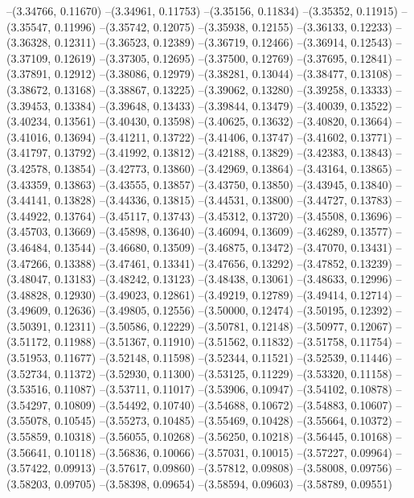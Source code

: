 --(3.34766, 0.11670)
--(3.34961, 0.11753)
--(3.35156, 0.11834)
--(3.35352, 0.11915)
--(3.35547, 0.11996)
--(3.35742, 0.12075)
--(3.35938, 0.12155)
--(3.36133, 0.12233)
--(3.36328, 0.12311)
--(3.36523, 0.12389)
--(3.36719, 0.12466)
--(3.36914, 0.12543)
--(3.37109, 0.12619)
--(3.37305, 0.12695)
--(3.37500, 0.12769)
--(3.37695, 0.12841)
--(3.37891, 0.12912)
--(3.38086, 0.12979)
--(3.38281, 0.13044)
--(3.38477, 0.13108)
--(3.38672, 0.13168)
--(3.38867, 0.13225)
--(3.39062, 0.13280)
--(3.39258, 0.13333)
--(3.39453, 0.13384)
--(3.39648, 0.13433)
--(3.39844, 0.13479)
--(3.40039, 0.13522)
--(3.40234, 0.13561)
--(3.40430, 0.13598)
--(3.40625, 0.13632)
--(3.40820, 0.13664)
--(3.41016, 0.13694)
--(3.41211, 0.13722)
--(3.41406, 0.13747)
--(3.41602, 0.13771)
--(3.41797, 0.13792)
--(3.41992, 0.13812)
--(3.42188, 0.13829)
--(3.42383, 0.13843)
--(3.42578, 0.13854)
--(3.42773, 0.13860)
--(3.42969, 0.13864)
--(3.43164, 0.13865)
--(3.43359, 0.13863)
--(3.43555, 0.13857)
--(3.43750, 0.13850)
--(3.43945, 0.13840)
--(3.44141, 0.13828)
--(3.44336, 0.13815)
--(3.44531, 0.13800)
--(3.44727, 0.13783)
--(3.44922, 0.13764)
--(3.45117, 0.13743)
--(3.45312, 0.13720)
--(3.45508, 0.13696)
--(3.45703, 0.13669)
--(3.45898, 0.13640)
--(3.46094, 0.13609)
--(3.46289, 0.13577)
--(3.46484, 0.13544)
--(3.46680, 0.13509)
--(3.46875, 0.13472)
--(3.47070, 0.13431)
--(3.47266, 0.13388)
--(3.47461, 0.13341)
--(3.47656, 0.13292)
--(3.47852, 0.13239)
--(3.48047, 0.13183)
--(3.48242, 0.13123)
--(3.48438, 0.13061)
--(3.48633, 0.12996)
--(3.48828, 0.12930)
--(3.49023, 0.12861)
--(3.49219, 0.12789)
--(3.49414, 0.12714)
--(3.49609, 0.12636)
--(3.49805, 0.12556)
--(3.50000, 0.12474)
--(3.50195, 0.12392)
--(3.50391, 0.12311)
--(3.50586, 0.12229)
--(3.50781, 0.12148)
--(3.50977, 0.12067)
--(3.51172, 0.11988)
--(3.51367, 0.11910)
--(3.51562, 0.11832)
--(3.51758, 0.11754)
--(3.51953, 0.11677)
--(3.52148, 0.11598)
--(3.52344, 0.11521)
--(3.52539, 0.11446)
--(3.52734, 0.11372)
--(3.52930, 0.11300)
--(3.53125, 0.11229)
--(3.53320, 0.11158)
--(3.53516, 0.11087)
--(3.53711, 0.11017)
--(3.53906, 0.10947)
--(3.54102, 0.10878)
--(3.54297, 0.10809)
--(3.54492, 0.10740)
--(3.54688, 0.10672)
--(3.54883, 0.10607)
--(3.55078, 0.10545)
--(3.55273, 0.10485)
--(3.55469, 0.10428)
--(3.55664, 0.10372)
--(3.55859, 0.10318)
--(3.56055, 0.10268)
--(3.56250, 0.10218)
--(3.56445, 0.10168)
--(3.56641, 0.10118)
--(3.56836, 0.10066)
--(3.57031, 0.10015)
--(3.57227, 0.09964)
--(3.57422, 0.09913)
--(3.57617, 0.09860)
--(3.57812, 0.09808)
--(3.58008, 0.09756)
--(3.58203, 0.09705)
--(3.58398, 0.09654)
--(3.58594, 0.09603)
--(3.58789, 0.09551)
